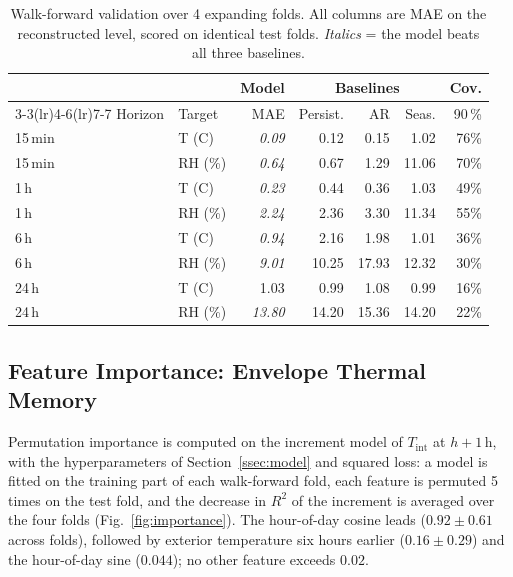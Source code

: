 \documentclass[conference]{IEEEtran}
\begin{document}
\begin{table}[!t]
\centering
\caption{Walk-forward validation over 4 expanding folds. All columns are
  MAE on the reconstructed level, scored on identical test folds.
  \textit{Italics} = the model beats all three baselines.}
\label{tab:results}
\setlength{\tabcolsep}{4.2pt}
\begin{tabular}{@{}llrrrrr@{}}
\toprule
& & \multicolumn{1}{c}{Model} & \multicolumn{3}{c}{Baselines}
  & \multicolumn{1}{c}{Cov.} \\
\cmidrule(lr){3-3}\cmidrule(lr){4-6}\cmidrule(lr){7-7}
Horizon & Target & MAE & Persist. & AR & Seas. & 90\,\% \\
\midrule
15\,min & T (\textdegree{}C) & \textit{0.09} &  0.12 &  0.15 &  1.02 & 76\% \\
15\,min & RH (\%)            & \textit{0.64} &  0.67 &  1.29 & 11.06 & 70\% \\
1\,h    & T (\textdegree{}C) & \textit{0.23} &  0.44 &  0.36 &  1.03 & 49\% \\
1\,h    & RH (\%)            & \textit{2.24} &  2.36 &  3.30 & 11.34 & 55\% \\
6\,h    & T (\textdegree{}C) & \textit{0.94} &  2.16 &  1.98 &  1.01 & 36\% \\
6\,h    & RH (\%)            & \textit{9.01} & 10.25 & 17.93 & 12.32 & 30\% \\
24\,h   & T (\textdegree{}C) &          1.03 &  0.99 &  1.08 &  0.99 & 16\% \\
24\,h   & RH (\%)            & \textit{13.80} & 14.20 & 15.36 & 14.20 & 22\% \\
\bottomrule
\end{tabular}
\end{table}

\subsection{Feature Importance: Envelope Thermal Memory}
\label{ssec:importance}

Permutation importance is computed on the increment model of
$T_\text{int}$ at $h{+}1$\,h, with the hyperparameters of
Section~\ref{ssec:model} and squared loss: a model is fitted on the
training part of each walk-forward fold, each feature is permuted 5
times on the test fold, and the decrease in $R^2$ of the increment is
averaged over the four folds (Fig.~\ref{fig:importance}). The
hour-of-day cosine leads ($0.92 \pm 0.61$ across folds), followed by
exterior temperature six hours earlier ($0.16 \pm 0.29$) and the
hour-of-day sine ($0.044$); no other feature exceeds $0.02$.
\end{document}
